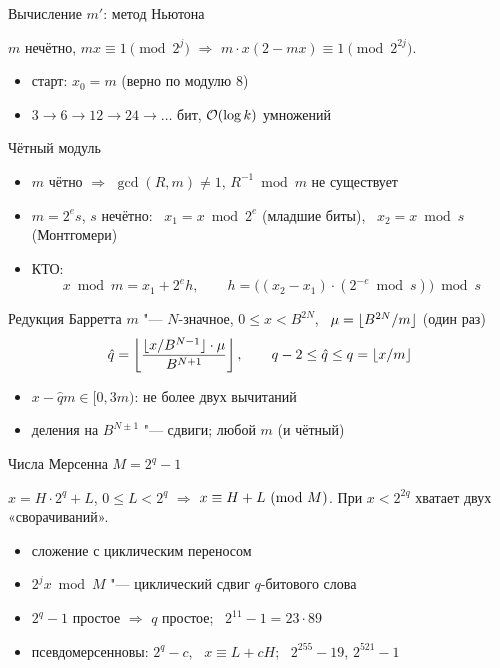 \documentclass{ca-slides}
\begin{document}
\begin{canvasframe}{Вычисление $m'$: метод Ньютона}
  \begin{lemma}
    $m$ нечётно, $mx \equiv 1 \pmod{2^j}$ $\Rightarrow$
    $m \cdot x(2 - mx) \equiv 1 \pmod{2^{2j}}$.
  \end{lemma}
  \begin{itemize}
    \item старт: $x_0 = m$ (верно по модулю $8$)
    \item $3 \to 6 \to 12 \to 24 \to \dots$ бит, $\mathcal{O}(\log k)$ умножений
  \end{itemize}
  \proofarea[0.15\textheight]
\end{canvasframe}

\begin{canvasframe}{Чётный модуль}
  \small
  \begin{itemize}
    \item $m$ чётно $\Rightarrow$ $\gcd(R, m) \ne 1$, $R^{-1} \bmod m$ не существует
    \item $m = 2^e s$, $s$ нечётно: \ $x_1 = x \bmod 2^e$ (младшие биты), \
      $x_2 = x \bmod s$ (Монтгомери)
    \item КТО:
      \[
        x \bmod m = x_1 + 2^e h, \qquad
        h = \bigl((x_2 - x_1)\cdot (2^{-e} \bmod s)\bigr) \bmod s
      \]
  \end{itemize}
  \notearea[0.2\textheight]
\end{canvasframe}

\begin{canvasframe}{Редукция Барретта}
  \small
  $m$ "--- $N$-значное, $0 \le x < B^{2N}$, \ $\mu = \lfloor B^{2N}/m\rfloor$ (один раз)
  \[
    \hat q = \left\lfloor \frac{\lfloor x / B^{N-1}\rfloor \cdot \mu}{B^{N+1}} \right\rfloor,
    \qquad q - 2 \le \hat q \le q = \lfloor x/m\rfloor
  \]
  \begin{itemize}
    \item $x - \hat q m \in [0, 3m)$: не более двух вычитаний
    \item деления на $B^{N\pm1}$ "--- сдвиги; любой $m$ (и чётный)
  \end{itemize}
  \proofarea[0.15\textheight]
\end{canvasframe}

\begin{canvasframe}{Числа Мерсенна $M = 2^q - 1$}
  \small
  \begin{proposition}
    $x = H \cdot 2^q + L$, $0 \le L < 2^q$ $\Rightarrow$ $x \equiv H + L\ (\mathrm{mod}\ M)$.
    При $x < 2^{2q}$ хватает двух «сворачиваний».
  \end{proposition}
  \begin{itemize}
    \item сложение с циклическим переносом
    \item $2^j x \bmod M$ "--- циклический сдвиг $q$-битового слова
    \item $2^q - 1$ простое $\Rightarrow$ $q$ простое; \ $2^{11} - 1 = 23 \cdot 89$
    \item псевдомерсенновы: $2^q - c$, \ $x \equiv L + cH$; \ $2^{255} - 19$, $2^{521} - 1$
  \end{itemize}
\end{canvasframe}
\end{document}
